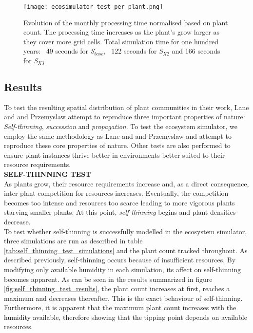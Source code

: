 \begin{figure}
\center
	\texttt{[image: ecosimulator\_test\_per\_plant.png]}
	\caption{ Evolution of the monthly processing time normalised based on plant count. The processing time increases as the plant's grow larger as they cover more grid cells. Total simulation time for one hundred years: ~49 seconds for \textit{S$_{base}$}, ~122 seconds for \textit{S$_{X2}$} and 166 seconds for \textit{S$_{X3}$}}
	\label{fig:ecosimulator_test_per_plant}
\end{figure}

\subsection{Results}

To test the resulting spatial distribution of plant communities in their work, Lane and and Przemyslaw \cite{Lane2002} attempt to reproduce three important properties of nature: \textit{Self-thinning}, \textit{succession} and \textit{propagation}. To test the ecosystem simulator, we employ the same methodology as Lane and and Przemyslaw \cite{Lane2002} and attempt to reproduce these core properties of nature. Other tests are also performed to ensure plant instances thrive better in environments better suited to their resource requirements.\\

\textbf{SELF-THINNING TEST}\\

As plants grow, their resource requirements increase and, as a direct consequence, inter-plant competition for resources increases. Eventually, the competition becomes too intense and resources too scarce leading to more vigorous plants starving smaller plants. At this point, \textit{self-thinning} begins and plant densities decrease.\\
To test whether self-thinning is successfully modelled in the ecosystem simulator, three simulations are run as described in table \ref{tab:self_thinning_test_simulations} and the plant count tracked throughout. As described previously, self-thinning occurs because of insufficient resources. By modifying only available humidity in each simulation, its affect on self-thinning becomes apparent. As can be seen in the results summarized in figure \ref{fig:self_thinning_test_results}, the plant count increases at first, reaches a maximum and decreases thereafter. This is the exact behaviour of self-thinning. Furthermore, it is apparent that the maximum plant count increases with the humidity available, therefore showing that the tipping point depends on available resources.\\

